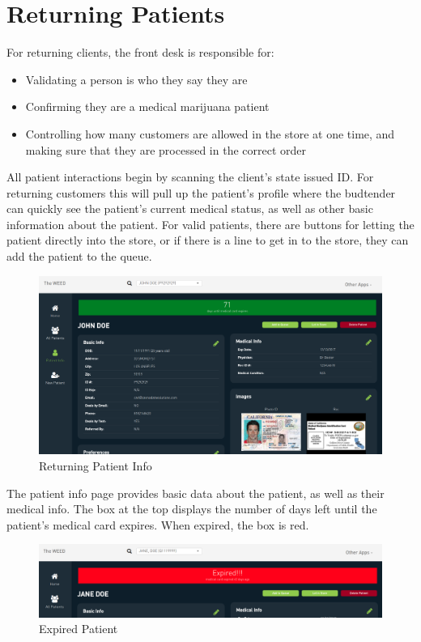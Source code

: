 \documentclass[]{book}
\theoremstyle{definition}
\theoremstyle{definition}
\theoremstyle{definition}
\theoremstyle{remark}
\begin{document}
\section{Returning Patients}\label{returning-patients}

For returning clients, the front desk is responsible for:

\begin{itemize}
\item
  Validating a person is who they say they are
\item
  Confirming they are a medical marijuana patient
\item
  Controlling how many customers are allowed in the store at one time,
  and making sure that they are processed in the correct order
\end{itemize}

All patient interactions begin by scanning the client's state issued ID.
For returning customers this will pull up the patient's profile where
the budtender can quickly see the patient's current medical status, as
well as other basic information about the patient. For valid patients,
there are buttons for letting the patient directly into the store, or if
there is a line to get in to the store, they can add the patient to the
queue.

\begin{figure}
\centering
\includegraphics{images/patientInfo.png}
\caption{Returning Patient Info}
\end{figure}

The patient info page provides basic data about the patient, as well as
their medical info. The box at the top displays the number of days left
until the patient's medical card expires. When expired, the box is red.

\begin{figure}
\centering
\includegraphics{images/expired.png}
\caption{Expired Patient}
\end{figure}
\end{document}
